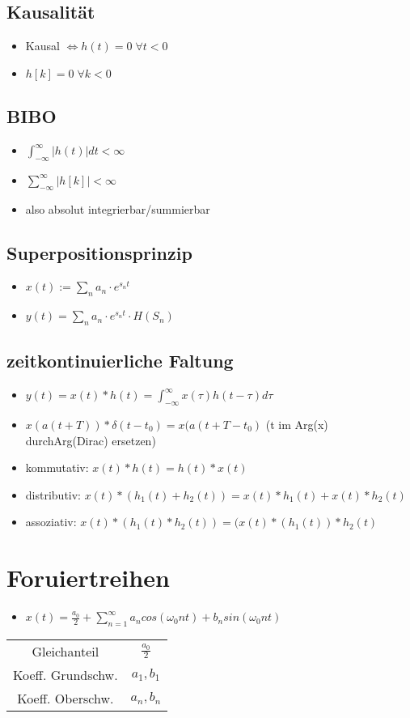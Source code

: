 \documentclass{article}
\begin{document}
\subsection{Kausalität}
\begin{itemize}
\item Kausal $\Leftrightarrow h(t) = 0 \;  \forall t < 0$
\item $h[k] = 0 \; \forall k<0$
\end{itemize}

\subsection{BIBO}
\begin{itemize}
\item $\int_{-\infty}^\infty |h(t)|dt < \infty$
\item $\sum_{-\infty}^\infty |h[k]| < \infty$
\item also absolut integrierbar/summierbar
\end{itemize}

\subsection{Superpositionsprinzip}
\begin{itemize}
\item $x(t) := \sum_n a_n\cdot e^{s_nt}$
\item $y(t) = \sum_n  a_n \cdot e^{s_n t} \cdot H(S_n)$
\end{itemize}


\subsection{zeitkontinuierliche Faltung}
\begin{itemize}
\item $y(t) = x(t)*h(t) = \int_{-\infty}^\infty x(\tau)h(t-\tau) d\tau$
\item $x(a(t+T))*\delta(t-t_0) = x(a(t+T-t_0)$ (t im Arg(x) durchArg(Dirac) ersetzen)
\item kommutativ: $x(t)*h(t) = h(t)*x(t)$
\item distributiv: $x(t)*(h_1(t)+h_2(t)) =x(t)*h_1(t)+x(t)*h_2(t)$
\item assoziativ: $x(t)*(h_1(t)*h_2(t)) = (x(t)*(h_1(t))*h_2(t)$
\end{itemize}



\section{Foruiertreihen}
\begin{itemize}
\item $x(t) = \frac{a_0}{2} + \sum_{n=1}^\infty a_n cos(\omega_0nt)+b_nsin(\omega_0nt)$
\end{itemize}
\begin{tabular}{ c c}
 Gleichanteil & $\frac{a_0}{2}$\\
 Koeff. Grundschw. & $a_1,b_1$ \\
 Koeff. Oberschw. & $a_n, b_n$ \\
 \end{tabular}
\end{document}

